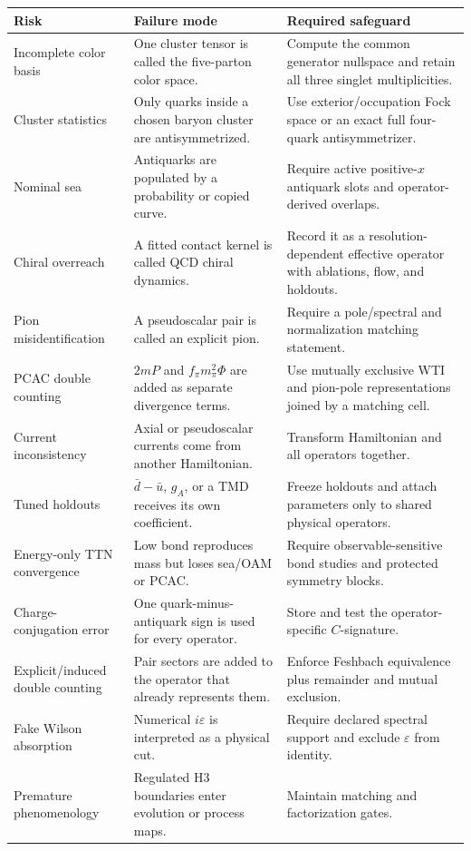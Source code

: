 \documentclass[11pt]{article}
\newcommand{\eps}{\varepsilon}
\begin{document}
\begin{longtable}{L{0.22\textwidth}L{0.34\textwidth}L{0.36\textwidth}}
\toprule
Risk & Failure mode & Required safeguard\\
\midrule
\endhead
Incomplete color basis & One cluster tensor is called the five-parton color
space. & Compute the common generator nullspace and retain all three singlet
multiplicities.\\
Cluster statistics & Only quarks inside a chosen baryon cluster are
antisymmetrized. & Use exterior/occupation Fock space or an exact full
four-quark antisymmetrizer.\\
Nominal sea & Antiquarks are populated by a probability or copied curve. &
Require active positive-\(x\) antiquark slots and operator-derived overlaps.\\
Chiral overreach & A fitted contact kernel is called QCD chiral dynamics. &
Record it as a resolution-dependent effective operator with ablations,
flow, and holdouts.\\
Pion misidentification & A pseudoscalar pair is called an explicit pion. &
Require a pole/spectral and normalization matching statement.\\
PCAC double counting & \(2mP\) and \(f_\pi m_\pi^2\Phi\) are added as
separate divergence terms. & Use mutually exclusive WTI and pion-pole
representations joined by a matching cell.\\
Current inconsistency & Axial or pseudoscalar currents come from another
Hamiltonian. & Transform Hamiltonian and all operators together.\\
Tuned holdouts & \(\bar d-\bar u\), \(g_A\), or a TMD receives its own
coefficient. & Freeze holdouts and attach parameters only to shared physical
operators.\\
Energy-only TTN convergence & Low bond reproduces mass but loses sea/OAM or
PCAC. & Require observable-sensitive bond studies and protected symmetry
blocks.\\
Charge-conjugation error & One quark-minus-antiquark sign is used for every
operator. & Store and test the operator-specific \(C\)-signature.\\
Explicit/induced double counting & Pair sectors are added to the operator that
already represents them. & Enforce Feshbach equivalence plus remainder and
mutual exclusion.\\
Fake Wilson absorption & Numerical \(i\eps\) is interpreted as a physical
cut. & Require declared spectral support and exclude \(\eps\) from identity.\\
Premature phenomenology & Regulated H3 boundaries enter evolution or process
maps. & Maintain matching and factorization gates.\\
\bottomrule
\end{longtable}
\end{document}
